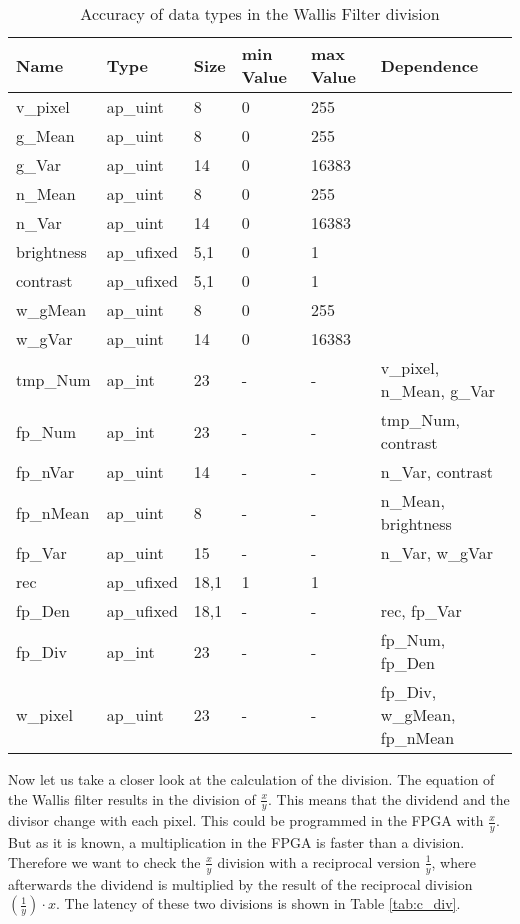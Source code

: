 \begin{table}[tb!]
    \centering
    \begin{tabular}{l l l l l l}
        \toprule
        Name & Type & Size & min Value & max Value & Dependence \\
        \midrule
        v\_pixel & ap\_uint & 8 & 0 & 255 & \\
        g\_Mean & ap\_uint & 8 & 0 & 255 &  \\
        g\_Var & ap\_uint & 14 & 0 & 16383 &  \\
        n\_Mean & ap\_uint & 8 & 0 & 255 &  \\
        n\_Var & ap\_uint & 14 & 0 & 16383 &  \\
        brightness & ap\_ufixed & 5,1 & 0 & 1 &  \\
        contrast & ap\_ufixed & 5,1 & 0 & 1 &  \\
        w\_gMean & ap\_uint & 8 & 0 & 255 &  \\
        w\_gVar & ap\_uint & 14 & 0 & 16383 &  \\
        tmp\_Num & ap\_int & 23 & - & - &  v\_pixel, n\_Mean, g\_Var \\
        fp\_Num & ap\_int & 23 & - & - &  tmp\_Num, contrast \\
        fp\_nVar & ap\_uint & 14 & - & - &  n\_Var, contrast \\
        fp\_nMean & ap\_uint & 8 & - & - &  n\_Mean, brightness \\
        fp\_Var & ap\_uint & 15 & - & - &  n\_Var, w\_gVar \\
        rec & ap\_ufixed & 18,1 & 1 & 1 &   \\
        fp\_Den & ap\_ufixed & 18,1 & - & - &  rec, fp\_Var \\
        fp\_Div & ap\_int & 23 & - & - &  fp\_Num, fp\_Den \\
        w\_pixel & ap\_uint & 23 & - & - &  fp\_Div, w\_gMean, fp\_nMean \\
        \bottomrule
    \end{tabular}
    \caption{Accuracy of data types in the Wallis Filter division}
    \label{tab:datatypes}
\end{table}

Now let us take a closer look at the calculation of the division. The equation of the Wallis filter results in the division of $\frac{x}{y}$. This means that the dividend and the divisor change with each pixel. This could be programmed in the FPGA with $\frac{x}{y}$. But as it is known, a multiplication in the FPGA is faster than a division. Therefore we want to check the $\frac{x}{y}$ division with a reciprocal version $\frac{1}{y}$, where afterwards the dividend is multiplied by the result of the reciprocal division $(\frac{1}{y}) \cdot x$. The latency of these two divisions is shown in Table \ref{tab:c_div}. \\

